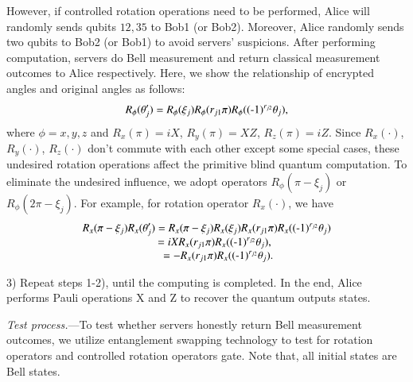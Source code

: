 \documentclass[aps,pra,showpacs,twocolumn,superscriptaddress]{revtex4-1}
\begin{document}
However, if controlled rotation operations need to be performed, Alice will randomly sends qubits $12,35$ to Bob1 (or Bob2). Moreover, Alice randomly sends two qubits to Bob2 (or Bob1) to avoid servers' suspicions. After performing computation, servers do Bell measurement and return classical measurement outcomes to Alice respectively. Here, we show the relationship of encrypted angles and original angles as follows:
\begin{eqnarray*}
R_\phi(\theta'_j)=R_\phi(\xi_j)R_\phi(r_{j1}\pi)R_\phi((\textnormal{-}1)^{r_{j2}}\theta_j),
\end{eqnarray*}
where $\phi=x, y, z$ and $R_x(\pi)= iX$, $R_y(\pi)= XZ$, $R_z(\pi)= iZ.$ Since $R_x(\cdot)$, $R_y(\cdot)$, $R_z(\cdot)$ don't commute with each other except some special cases, these undesired rotation operations affect the primitive blind quantum computation. To eliminate the undesired influence,
we adopt operators $R_\phi(\pi-\xi_j)$ or $R_\phi(2\pi-\xi_j)$. For example, for rotation operator $R_x(\cdot)$, we have
\begin{eqnarray*}
\begin{array}{l}
\displaystyle R_x(\pi-\xi_j)R_x(\theta'_j)=R_x(\pi-\xi_j)R_x(\xi_j)R_x(r_{j1}\pi)R_x((\textnormal{-}1)^{r_{j2}}\theta_j)\\
\displaystyle \qquad\qquad\qquad\ \ \ =iXR_x(r_{j1}\pi)R_x((\textnormal{-}1)^{r_{j2}}\theta_j),\\
\displaystyle \qquad\qquad\qquad\quad\ =-R_x(r_{j1}\pi)R_x((\textnormal{-}1)^{r_{j2}}\theta_j).
\end{array}
\end{eqnarray*}

3) Repeat steps 1-2), until the computing is completed. In the end, Alice performs Pauli operations X and Z to recover the quantum outputs states.

\emph{Test process.}---To test whether servers honestly return Bell measurement outcomes, we utilize entanglement swapping technology to test for rotation operators and controlled rotation operators gate. Note that, all initial states are Bell states.
\end{document}

